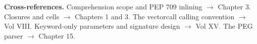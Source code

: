 \textbf{Cross-references.} Comprehension scope and PEP 709 inlining $\rightarrow$ Chapter 3. Closures
and cells $\rightarrow$ Chapters 1 and 3. The vectorcall calling convention $\rightarrow$ Vol VIII.
Keyword-only parameters and signature design $\rightarrow$ Vol XV. The PEG parser $\rightarrow$
Chapter 15.
